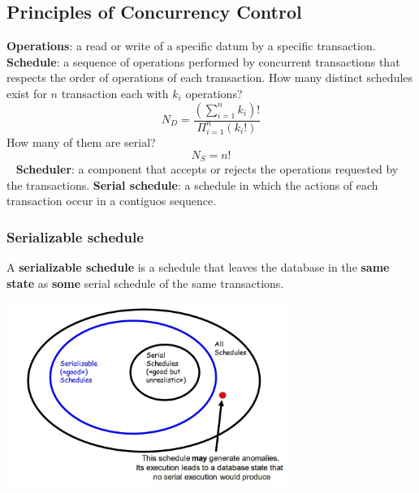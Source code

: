 \subsection{Principles of Concurrency Control}
\textbf{Operations}: a read or write of a specific datum by a specific transaction.\newline
\newline
\textbf{Schedule}: a sequence of operations performed by concurrent transactions that respects the order of operations of each transaction.\newline
How many distinct schedules exist for $n$ transaction each with $k_i$ operations?
\[
    N_D = \frac{\left(\sum_{i=1}^{n}k_i\right)!}{\Pi_{i=1}^n (k_i !)}
\]
How many of them are serial?
\[
    N_S = n!
\]
\ \newline
\textbf{Scheduler}: a component that accepts or rejects the operations requested by the transactions.\newline
\newline
\textbf{Serial schedule}: a schedule in which the actions of each transaction occur in a contiguos sequence.
\subsubsection{Serializable schedule}
A \textbf{serializable schedule} is a schedule that leaves the database in the \textbf{same state} as \textbf{some} serial schedule of the same transactions.
\begin{center}
    \includegraphics[height=6cm]{../arguments/serializableSchedules.JPG}
\end{center}
